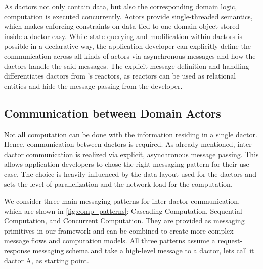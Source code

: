     As \glspl{dactor} not only contain data, but also the corresponding domain logic, computation is executed concurrently.
    Actors provide single-threaded semantics, which makes enforcing constraints on data tied to one domain object stored inside a \gls{dactor} easy.
    While state querying and modification within \glspl{dactor} is possible in a declarative way, the application developer can explicitly define the communication across all kinds of actors via asynchronous messages and how the \glspl{dactor} handle the said messages.
    The explicit message definition and handling differentiates \glspl{dactor} from \citet{Shah:reactdb}'s reactors, as reactors can be used as relational entities and hide the message passing from the developer.

  \subsection{Communication between Domain Actors}\label{sec:dactor_comm}
    Not all computation can be done with the information residing in a single \gls{dactor}.
    Hence, communication between \glspl{dactor} is required.
    As already mentioned, inter-\gls{dactor} communication is realized via explicit, asynchronous message passing.
    This allows application developers to chose the right messaging pattern for their use case.
    The choice is heavily influenced by the data layout used for the \glspl{dactor} and sets the level of parallelization and the network-load for the computation.

    We consider three main messaging patterns for inter-\gls{dactor} communication, which are shown in \cref{fig:comp_patterns}: Cascading Computation, Sequential Computation, and Concurrent Computation.
    They are provided as messaging primitives in our framework and can be combined to create more complex message flows and computation models.
    All three patterns assume a request-response messaging schema and take a high-level message to a \gls{dactor}, lets call it \gls{dactor} A, as starting point.

